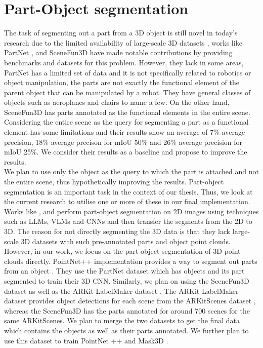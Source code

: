  \section{Part-Object segmentation}
The task of segmenting out a part from a 3D object is still novel in today's research due to the limited availability of large-scale 3D datasets
, works like PartNet \cite{Mo_2019_CVPR}, and SceneFun3D \cite{delitzas2024scenefun3d} have made notable contributions by providing benchmarks and datasets for this problem. 
However, they lack in some areas, PartNet has a limited set of data and it is not specifically related to robotics or object manipulation, the parts are not
exactly the functional element of the parent object that can be manipulated by a robot. They have general
classes of objects such as aeroplanes and chairs to name a few. On the other hand, SceneFun3D has parts annotated as the functional elements in the entire scene. Considering
the entire scene as the query for segmenting a part as a functional element has some limitations and their results show an average of 7\% average precision, 18\% average precison for mIoU 
50\% and 26\% average precision for mIoU 25\%. We consider their results as a baseline and propose to improve the results. \\
We plan to use only the object as the query to which the part is attached and not the entire scene, thus hypothetically improving the results.
Part-object segmentation is an important task in the context of our thesis. Thus, we look at the current research to utilise one or more of these
in our final implementation. Works like \cite{Liu_2023_CVPR}, and \cite{10.1007/978-3-031-72652-1_25} perform part-object segmentation on 2D images using techniques such as LLMs, VLMs and CNNs and then transfer the 
segments from the 2D to 3D. The reason for not directly segmenting the 3D data is that they lack large-scale 3D datasets with such pre-annotated parts
and object point clouds. \\
However, in our work, we focus on the part-object segmentation of 3D point clouds directly. PointNet++ implementation provides a way to segment out parts from an object \cite{qi2017pointnetdeephierarchicalfeature}. 
They use the PartNet dataset which has objects and its part segmented to train their 3D CNN. Similarly, we plan on using the SceneFun3D dataset as well as 
the ARKit LabelMaker dataset \cite{ji2024arkitlabelmakernewscale}. The ARKit LabelMaker dataset provides object detections for each scene from the ARKitScenes dataset \cite{baruch2021arkitscenes}, whereas the SceneFun3D has
the parts annotated for around 700 scenes for the same ARKitScenes. We plan to merge the two datasets to get the final data which contains the objects as 
well as their parts annotated. We further plan to use this dataset to train PointNet ++ and Mask3D \cite{schult2023mask3dmasktransformer3d}.

